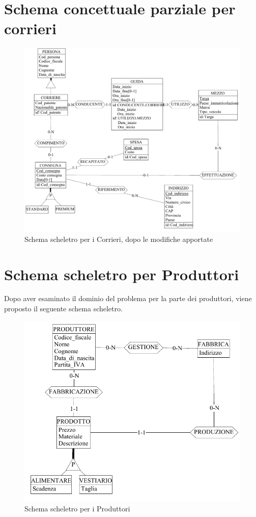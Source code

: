 \documentclass[a4paper,12pt]{report}
\begin{document}
\section{Schema concettuale parziale per corrieri}
\begin{figure}[h]
	\centering{}
	\includegraphics[width=\textwidth]{img/SchemaConcettuale-Corrieri2.pdf}
	\caption{Schema scheletro per i Corrieri, dopo le modifiche apportate}
\end{figure}
\section{Schema scheletro per Produttori}
Dopo aver esaminato il dominio del problema per la parte dei produttori, viene proposto il seguente schema scheletro.
\begin{figure}[h]
	\centering{}
	\includegraphics[width=\textwidth]{img/SchemaConcettuale-Produttori1.pdf}
	\caption{Schema scheletro per i Produttori}
\end{figure}
\end{document}
